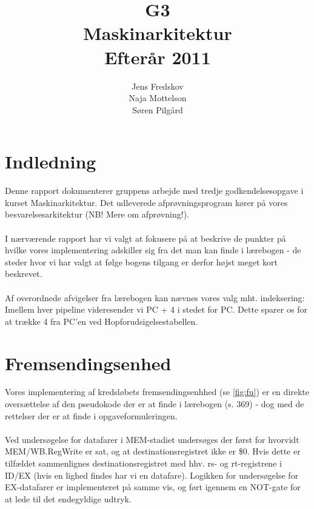 \documentclass[10pt,a4paper,danish]{article}
\title{G3\\Maskinarkitektur\\Efterår 2011}
\author{Jens Fredskov\\ Naja Mottelson\\Søren Pilgård}
\begin{document}
\maketitle
\newpage

\tableofcontents
\newpage

\section{Indledning}
Denne rapport dokumenterer gruppens arbejde med tredje godkendelsesopgave i kurset 
Maskinarkitektur. Det udleverede afprøvningsprogram kører på vores besvarelsesarkitektur 
(NB! Mere om afprøvning!). 

\paragraph{}
I nærværende rapport har vi valgt at fokusere på at beskrive de punkter på 
hvilke vores implementering adskiller sig fra det man kan finde i lærebogen - 
de steder hvor vi har valgt at følge bogens tilgang er derfor højst meget 
kort beskrevet. 

\paragraph{}
Af overordnede afvigelser fra lærebogen kan nævnes vores valg mht. indeksering:
Imellem hver pipeline videresender vi PC + 4 i stedet for PC. Dette sparer os 
for at trække 4 fra PC'en ved Hopforudsigelsestabellen. 

\paragraph{}

\section{Fremsendingsenhed}
Vores implementering af kredsløbets fremsendingsenhhed (se \ref{fig:fu}) er 
en direkte oversættelse af den pseudokode der er at finde i lærebogen (s. 369)
- dog med de rettelser der er at finde i opgaveformuleringen. 

\paragraph{}
Ved undersøgelse for datafarer i MEM-stadiet undersøges der først 
for hvorvidt MEM/WB.RegWrite er sat, og at destinationsregistret
ikke er \$0. Hvis dette er tilfældet sammenlignes destinationsregistret
med hhv. rs- og rt-registrene i ID/EX (hvis en lighed findes har vi en 
datafare). Logikken for undersøgelse for EX-datafarer er implementeret
på samme vis, og ført igennem en NOT-gate for at lede til det endegyldige
udtryk. 
\end{document}
